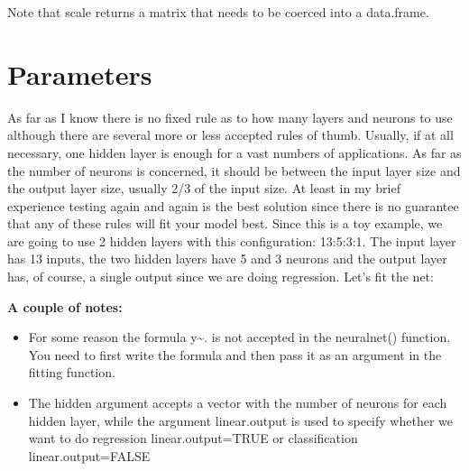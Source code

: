 \documentclass[]{book}
\newenvironment{Shaded}{\begin{snugshade}}{\end{snugshade}}
\newcommand{\DataTypeTok}[1]{\textcolor[rgb]{0.13,0.29,0.53}{#1}}
\newcommand{\DecValTok}[1]{\textcolor[rgb]{0.00,0.00,0.81}{#1}}
\newcommand{\KeywordTok}[1]{\textcolor[rgb]{0.13,0.29,0.53}{\textbf{#1}}}
\newcommand{\NormalTok}[1]{#1}
\newcommand{\OperatorTok}[1]{\textcolor[rgb]{0.81,0.36,0.00}{\textbf{#1}}}
\newcommand{\StringTok}[1]{\textcolor[rgb]{0.31,0.60,0.02}{#1}}
\begin{document}
Note that scale returns a matrix that needs to be coerced into a data.frame.

\hypertarget{parameters}{%
\section{Parameters}\label{parameters}}

As far as I know there is no fixed rule as to how many layers and neurons to use although there are several more or less accepted rules of thumb. Usually, if at all necessary, one hidden layer is enough for a vast numbers of applications. As far as the number of neurons is concerned, it should be between the input layer size and the output layer size, usually 2/3 of the input size. At least in my brief experience testing again and again is the best solution since there is no guarantee that any of these rules will fit your model best.
Since this is a toy example, we are going to use 2 hidden layers with this configuration: 13:5:3:1. The input layer has 13 inputs, the two hidden layers have 5 and 3 neurons and the output layer has, of course, a single output since we are doing regression.
Let's fit the net:

\begin{Shaded}
\end{Shaded}

\textbf{A couple of notes:}

\begin{itemize}
\item
  For some reason the formula y\textasciitilde{}. is not accepted in the neuralnet() function. You need to first write the formula and then pass it as an argument in the fitting function.
\item
  The hidden argument accepts a vector with the number of neurons for each hidden layer, while the argument linear.output is used to specify whether we want to do regression linear.output=TRUE or classification linear.output=FALSE
\end{itemize}
\end{document}
